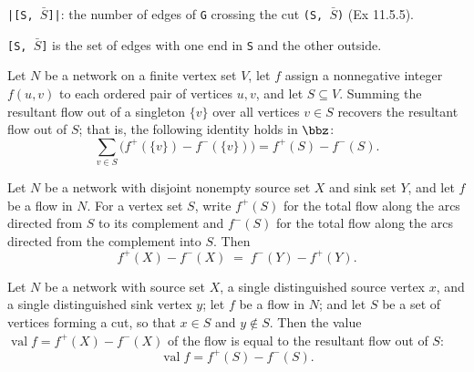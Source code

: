 \begin{definition}
\label{Networks.edgeBoundaryCard}
\leanok
\texttt{|[S, $\bar{S}$]|}: the number of edges of \texttt{G} crossing the cut \texttt{(S, $\bar{S}$)} (Ex 11.5.5).

\texttt{[S, $\bar{S}$]} is the set of edges
with one end in \texttt{S} and the other outside.
\end{definition}

\begin{theorem}
\label{Networks.sum_resultant_eq_fOut_sub_fIn}
\leanok
{}
Let $N$ be a network on a finite vertex set $V$, let $f$ assign a nonnegative integer
$f(u,v)$ to each ordered pair of vertices $u,v$, and let $S\subseteq V$. Summing the
resultant flow out of a singleton $\{v\}$ over all vertices $v\in S$ recovers the
resultant flow out of $S$; that is, the following identity holds in $\bbz$:
\[
  \sum_{v\in S}\bigl(f^{+}(\{v\})-f^{-}(\{v\})\bigr)=f^{+}(S)-f^{-}(S).
\]
\end{theorem}

\begin{theorem}
\label{Networks.fOut_X_sub_fIn_X_eq_fIn_Y_sub_fOut_Y}
\leanok
{}
Let $N$ be a network with disjoint nonempty source set $X$ and sink set $Y$, and let $f$
be a flow in $N$. For a vertex set $S$, write $f^{+}(S)$ for the total flow along the
arcs directed from $S$ to its complement and $f^{-}(S)$ for the total flow along the
arcs directed from the complement into $S$. Then
\[
f^{+}(X) - f^{-}(X) \;=\; f^{-}(Y) - f^{+}(Y).
\]
\end{theorem}

\begin{theorem}
\label{Networks.val_eq_fOut_sub_fIn}
\leanok
{}
Let $N$ be a network with source set $X$, a single distinguished source vertex $x$, and
a single distinguished sink vertex $y$; let $f$ be a flow in $N$; and let $S$ be a set
of vertices forming a cut, so that $x \in S$ and $y \notin S$. Then the value
$\operatorname{val} f = f^{+}(X) - f^{-}(X)$ of the flow is equal to the resultant flow
out of $S$:
\[
\operatorname{val} f = f^{+}(S) - f^{-}(S).
\]
\end{theorem}

